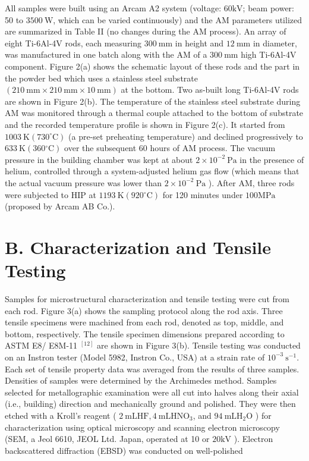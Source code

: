 \documentclass[10pt]{article}
\begin{document}
All samples were built using an Arcam A2 system (voltage: $60 \mathrm{kV}$; beam power: 50 to $3500 \mathrm{~W}$, which can be varied continuously) and the AM parameters utilized are summarized in Table II (no changes during the AM process). An array of eight Ti-6Al-4V rods, each measuring $300 \mathrm{~mm}$ in height and $12 \mathrm{~mm}$ in diameter, was manufactured in one batch along with the AM of a $300 \mathrm{~mm}$ high Ti-6Al-4V component. Figure 2(a) shows the schematic layout of these rods and the part in the powder bed which uses a stainless steel substrate $(210 \mathrm{~mm} \times 210 \mathrm{~mm} \times 10 \mathrm{~mm})$ at the bottom. Two as-built long Ti-6Al-4V rods are shown in Figure 2(b). The temperature of the stainless steel substrate during AM was monitored through a thermal couple attached to the bottom of substrate and the recorded temperature profile is shown in Figure 2(c). It started from $1003 \mathrm{~K}\left(730^{\circ} \mathrm{C}\right)$ (a pre-set preheating temperature) and declined progressively to $633 \mathrm{~K}\left(360{ }^{\circ} \mathrm{C}\right)$ over the subsequent 60 hours of AM process. The vacuum pressure in the building chamber was kept at about $2 \times 10^{-2} \mathrm{~Pa}$ in the presence of helium, controlled through a system-adjusted helium gas flow (which means that the actual vacuum pressure was lower than $2 \times 10^{-2} \mathrm{~Pa}$ ). After $\mathrm{AM}$, three rods were subjected to HIP at $1193 \mathrm{~K}\left(920{ }^{\circ} \mathrm{C}\right)$ for 120 minutes under $100 \mathrm{MPa}$ (proposed by Arcam AB Co.).

\section*{B. Characterization and Tensile Testing}
Samples for microstructural characterization and tensile testing were cut from each rod. Figure 3(a) shows the sampling protocol along the rod axis. Three tensile specimens were machined from each rod, denoted as top, middle, and bottom, respectively. The tensile specimen dimensions prepared according to ASTM E8/ E8M-11 ${ }^{[12]}$ are shown in Figure 3(b). Tensile testing was conducted on an Instron tester (Model 5982, Instron Co., USA) at a strain rate of $10^{-3} \mathrm{~s}^{-1}$. Each set of tensile property data was averaged from the results of three samples. Densities of samples were determined by the Archimedes method. Samples selected for metallographic examination were all cut into halves along their axial (i.e., building) direction and mechanically ground and polished. They were then etched with a Kroll's reagent ( $2 \mathrm{~mL} \mathrm{HF}, 4 \mathrm{~mL} \mathrm{HNO}_{3}$, and $94 \mathrm{~mL} \mathrm{H}_{2} \mathrm{O}$ ) for characterization using optical microscopy and scanning electron microscopy (SEM, a Jeol 6610, JEOL Ltd. Japan, operated at 10 or $20 \mathrm{kV}$ ). Electron backscattered diffraction (EBSD) was conducted on well-polished
\end{document}
